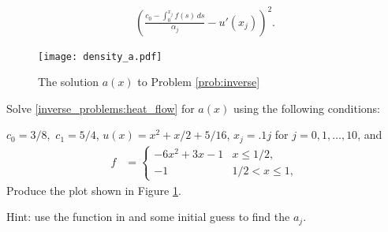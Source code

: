 \begin{align*}
	\left( \frac{c_0 - \int_0^{x_j} f(s)\, ds}{\alpha_j} - u'(x_j)  \right)^2.
\end{align*}
%
%
%
%
%
%
%
%
%

\begin{figure}
\centering
\texttt{[image: density\_a.pdf]}
\caption{The solution $a(x)$ to Problem \ref{prob:inverse}}
\label{fig:inverse_problems:num1}
\end{figure}

\begin{problem}
Solve \eqref{inverse_problems:heat_flow} for $a(x)$ using the following conditions:

\noindent $c_0 = 3/8,$ $c_1 = 5/4$, $u(x) = x^2 + x/2 + 5/16$, $x_j=.1j$ for $j=0,1,\dots,10$, and 
\begin{align*}
	f &= \begin{cases}
		-6x^2 + 3x - 1 & x \leq 1/2,\\
		-1 & 1/2 < x \leq 1,
	\end{cases}
\end{align*}
Produce the plot shown in Figure \ref{fig:inverse_problems:num1}.

Hint: use the  function in  and some initial guess to find the $a_j$.
\label{prob:inverse}
\end{problem}


